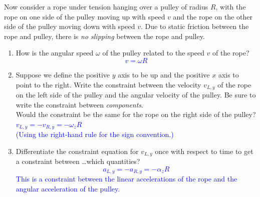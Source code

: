 \documentclass[11pt, letterpaper, openany]{book}
\newenvironment{exercise}[1][Exercise]{%
  \tcolorbox[blanker, breakable, left=1em,
    before skip=1em, after skip=1em,
    borderline west={3pt}{0pt}{PhysNavy},
    colback=PhysCream,
    before upper={\textcolor{PhysNavy}{\sffamily\bfseries #1:}\space}
  ]%
}{%
  \endtcolorbox%
}
\begin{document}
\begin{exercise}[Exercise 4]
Now consider a rope under tension hanging over a pulley of radius $R$, with the rope on one side of the pulley moving up with speed $v$ and the rope on the other side of the pulley moving down with speed $v$. Due to static friction between the rope and pulley, there is \textit{no slipping} between the rope and pulley.
\begin{enumerate}[label=(\alph*)]
    \item How is the angular speed $\omega$ of the pulley related to the speed $v$ of the rope? \\
    \textcolor{blue}{\[ v = \omega R \]}
    
    \item Suppose we define the positive $y$ axis to be up and the positive $x$ axis to point to the right. Write the constraint between the velocity $v_{L,y}$ of the rope on the left side of the pulley and the angular velocity of the pulley. Be sure to write the constraint between \textit{components}. \\
    Would the constraint be the same for the rope on the right side of the pulley? \\
    \textcolor{blue}{
    $v_{L,y} = -v_{R,y} = -\omega_z R$ \\
    (Using the right-hand rule for the sign convention.)
    }
    
    \item Differentiate the constraint equation for $v_{L,y}$ once with respect to time to get a constraint between \ldots which quantities? \\
    \textcolor{blue}{
    \[ a_{L,y} = -a_{R,y} = -\alpha_z R \]
    This is a constraint between the linear accelerations of the rope and the angular acceleration of the pulley.
    }
\end{enumerate}
\end{exercise}
\end{document}
